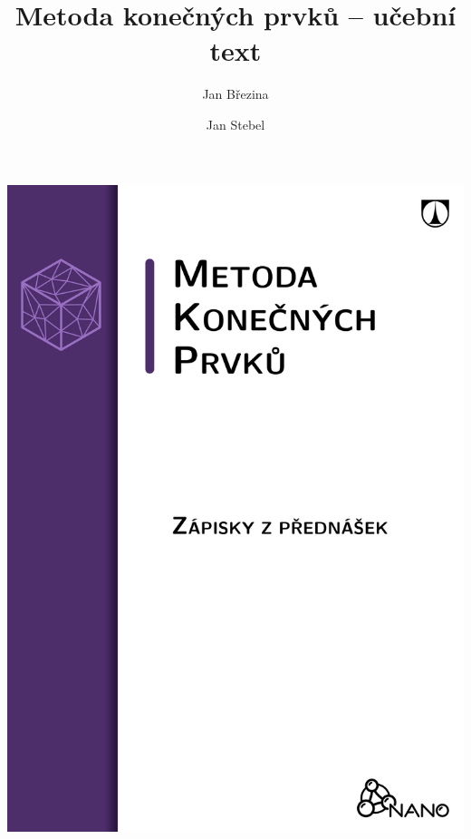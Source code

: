 \documentclass[a4paper]{article}
\title{Metoda konečných prvků -- učební text}
\author{Jan Březina \and Jan Stebel}
\numberwithin{equation}{section}
\newcommand{\0}{\vec{0}}
\begin{document}
\includegraphics[width=\textwidth]{img/image1.png}

\maketitle

\tableofcontents

%
%
%












% 






\end{document}
